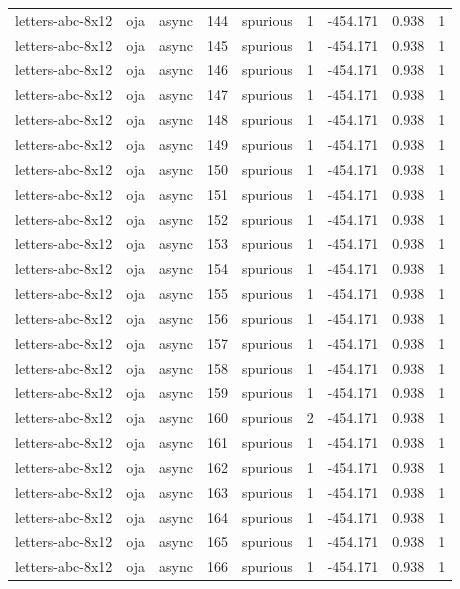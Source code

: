 \begin{tabular}{lllrlrrrr}
letters-abc-8x12 & oja & async & 144 & spurious & 1 & -454.171 & 0.938 & 1 \\
letters-abc-8x12 & oja & async & 145 & spurious & 1 & -454.171 & 0.938 & 1 \\
letters-abc-8x12 & oja & async & 146 & spurious & 1 & -454.171 & 0.938 & 1 \\
letters-abc-8x12 & oja & async & 147 & spurious & 1 & -454.171 & 0.938 & 1 \\
letters-abc-8x12 & oja & async & 148 & spurious & 1 & -454.171 & 0.938 & 1 \\
letters-abc-8x12 & oja & async & 149 & spurious & 1 & -454.171 & 0.938 & 1 \\
letters-abc-8x12 & oja & async & 150 & spurious & 1 & -454.171 & 0.938 & 1 \\
letters-abc-8x12 & oja & async & 151 & spurious & 1 & -454.171 & 0.938 & 1 \\
letters-abc-8x12 & oja & async & 152 & spurious & 1 & -454.171 & 0.938 & 1 \\
letters-abc-8x12 & oja & async & 153 & spurious & 1 & -454.171 & 0.938 & 1 \\
letters-abc-8x12 & oja & async & 154 & spurious & 1 & -454.171 & 0.938 & 1 \\
letters-abc-8x12 & oja & async & 155 & spurious & 1 & -454.171 & 0.938 & 1 \\
letters-abc-8x12 & oja & async & 156 & spurious & 1 & -454.171 & 0.938 & 1 \\
letters-abc-8x12 & oja & async & 157 & spurious & 1 & -454.171 & 0.938 & 1 \\
letters-abc-8x12 & oja & async & 158 & spurious & 1 & -454.171 & 0.938 & 1 \\
letters-abc-8x12 & oja & async & 159 & spurious & 1 & -454.171 & 0.938 & 1 \\
letters-abc-8x12 & oja & async & 160 & spurious & 2 & -454.171 & 0.938 & 1 \\
letters-abc-8x12 & oja & async & 161 & spurious & 1 & -454.171 & 0.938 & 1 \\
letters-abc-8x12 & oja & async & 162 & spurious & 1 & -454.171 & 0.938 & 1 \\
letters-abc-8x12 & oja & async & 163 & spurious & 1 & -454.171 & 0.938 & 1 \\
letters-abc-8x12 & oja & async & 164 & spurious & 1 & -454.171 & 0.938 & 1 \\
letters-abc-8x12 & oja & async & 165 & spurious & 1 & -454.171 & 0.938 & 1 \\
letters-abc-8x12 & oja & async & 166 & spurious & 1 & -454.171 & 0.938 & 1 \\

\end{tabular}
